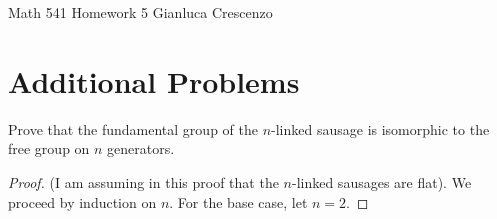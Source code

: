 \documentclass[9pt,oneside,openany]{memoir}
\begin{document}
\homeworktitle
{Math 541} %
{Homework 5} %
{Gianluca Crescenzo} %

\section*{Additional Problems}
\begin{problem}[manual-num={1}]
	Prove that the fundamental group of the $n$-linked sausage is isomorphic to the free group on $n$ generators.
\end{problem}
	\begin{proof}
		(I am assuming in this proof that the $n$-linked sausages are flat). We proceed by induction on $n$. For the base case, let $n = 2$. 
	\end{proof}
\end{document}
